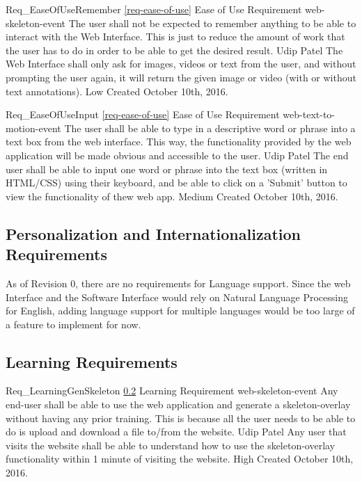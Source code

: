 \documentclass{scrreprt}
\begin{document}
\requirement
{Req_EaseOfUseRemember}
{\ref{req-ease-of-use} Ease of Use Requirement}
{web-skeleton-event}
{The user shall not be expected to remember anything to be able to interact with the Web Interface.}
{This is just to reduce the amount of work that the user has to do in order to be able to get the desired result.}
{Udip Patel}
{The Web Interface shall only ask for images, videos or text from the user, and without prompting the user again, it will return the given image or video (with or without text annotations).}
{Low}
{Created October 10th, 2016.}

\requirement
{Req_EaseOfUseInput}
{\ref{req-ease-of-use} Ease of Use Requirement}
{web-text-to-motion-event}
{The user shall be able to type in a descriptive word or phrase into a text box from the web interface.}
{This way, the functionality provided by the web application will be made obvious and accessible to the user.}
{Udip Patel}
{The end user shall be able to input one word or phrase into the text box (written in HTML/CSS) using their keyboard, and be able to click on a 'Submit' button to view the functionality of thew web app.}
{Medium}
{Created October 10th, 2016.}

\subsection{Personalization and Internationalization Requirements}

As of Revision 0, there are no requirements for Language support. Since the web Interface and the Software Interface would rely on Natural Language Processing for English, adding language support for multiple languages would be too large of a feature to implement for now.

\subsection{Learning Requirements}
\label{req-learning}

\requirement
{Req_LearningGenSkeleton}
{\ref{req-learning} Learning Requirement}
{web-skeleton-event}
{Any end-user shall be able to use the web application and generate a skeleton-overlay without having any prior training.}
{This is because all the user needs to be able to do is upload and download a file to/from the website.}
{Udip Patel}
{Any user that visits the website shall be able to understand how to use the skeleton-overlay functionality within 1 minute of visiting the website.}
{High}
{Created October 10th, 2016.}
\end{document}
